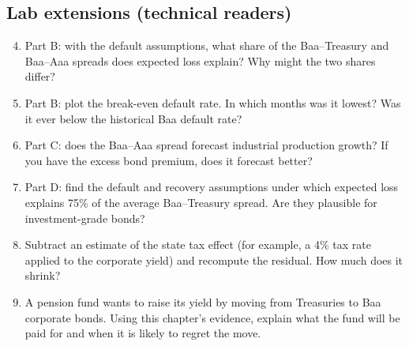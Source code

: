 \subsection*{Lab extensions (technical readers)}

\begin{enumerate}
  \setcounter{enumi}{3}
  \item Part B: with the default assumptions, what share of the Baa--Treasury and Baa--Aaa spreads does expected loss explain? Why might the two shares differ?
  \item Part B: plot the break-even default rate. In which months was it lowest? Was it ever below the historical Baa default rate?
  \item Part C: does the Baa--Aaa spread forecast industrial production growth? If you have the excess bond premium, does it forecast better?
  \item Part D: find the default and recovery assumptions under which expected loss explains 75\% of the average Baa--Treasury spread. Are they plausible for investment-grade bonds?
  \item Subtract an estimate of the state tax effect (for example, a 4\% tax rate applied to the corporate yield) and recompute the residual. How much does it shrink?
  \item A pension fund wants to raise its yield by moving from Treasuries to Baa corporate bonds. Using this chapter's evidence, explain what the fund will be paid for and when it is likely to regret the move.
\end{enumerate}
